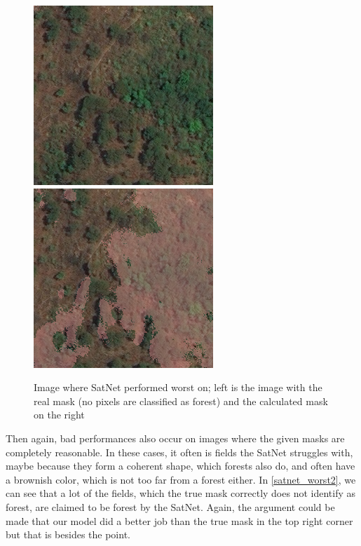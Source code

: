 \begin{figure}
  \begin{center}
  \label{satnet_worst1}
  \includegraphics[width=.4\linewidth]{images/satellite_images/sat_worst_1}
  \includegraphics[width=.4\linewidth]{images/satellite_images/sat_worst_2}
  \caption{Image where SatNet performed worst on; left is the image with the real mask (no pixels are classified as forest) and the calculated mask on the right}
  \end{center}
\end{figure}

Then again, bad performances also occur on images where the given masks are completely reasonable. In these cases, it often is fields the SatNet struggles with, maybe because they form a coherent shape, which forests also do, and often have a brownish color, which is not too far from a forest either. In \ref{satnet_worst2}, we can see that a lot of the fields, which the true mask correctly does not identify as forest, are claimed to be forest by the SatNet. Again, the argument could be made that our model did a better job than the true mask in the top right corner but that is besides the point. \\

